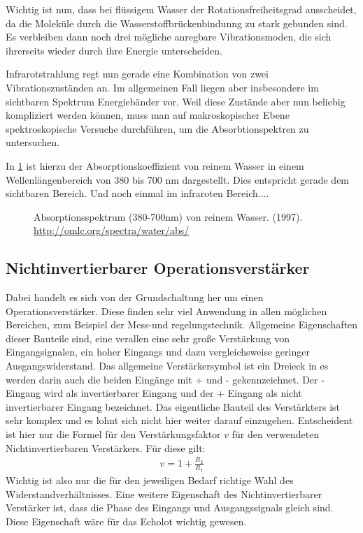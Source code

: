 \documentclass[12pt,a4paper,titlepage,headinclude,bibtotoc]{scrartcl}
\begin{document}
Wichtig ist nun, dass bei flüssigem Wasser der Rotationsfreiheitsgrad ausscheidet, da die Moleküle durch die Wasserstoffbrückenbindunng zu stark gebunden sind.
Es verbleiben dann noch drei mögliche anregbare Vibrationsmoden, die sich ihrerseits wieder durch ihre Energie unterscheiden.

Infrarotstrahlung regt nun gerade eine Kombination von zwei Vibrationszuständen an.
Im allgemeinen Fall liegen aber insbesondere im sichtbaren Spektrum Energiebänder vor.
Weil diese Zustände aber nun beliebig kompliziert werden können, muss man auf makroskopischer Ebene spektroskopische Versuche durchführen, um die Absorbtionspektren zu untersuchen.

In \ref{fig:abs} ist hierzu der Absorptionskoeffizient von reinem Wasser in einem Wellenlängenbereich von 380 bis 700 nm dargestellt.
Dies entspricht gerade dem sichtbaren Bereich.
Und noch einmal im infraroten Bereich....

\begin{figure}[h]
	\centering
	
	\caption{Absorptionsspektrum (380-700nm) von reinem Wasser. (1997). \url{http://omlc.org/spectra/water/abs/}}
	\label{fig:abs}
\end{figure}




\subsection{Nichtinvertierbarer Operationsverstärker}

Dabei handelt es sich von der Grundschaltung her um einen Operationsverstärker.
Diese finden sehr viel Anwendung in allen möglichen Bereichen, zum Beispiel 
der Mess-und regelungstechnik. 
Allgemeine Eigenschaften dieser Bauteile sind, eine verallen eine sehr große Verstärkung
von Eingangsignalen, ein hoher Eingangs und dazu vergleichsweise geringer Ausgangswiderstand.
Das allgemeine Verstärkersymbol ist ein Dreieck in es werden darin auch die beiden
Eingänge mit + und - gekennzeichnet.
Der - Eingang wird als invertierbarer Eingang und 
der + Eingang als nicht invertierbarer Eingang bezeichnet.
Das eigentliche Bauteil des Verstärkters ist sehr komplex und es lohnt sich nicht hier 
weiter darauf einzugehen.
Entscheident ist hier nur die Formel für den Verstärkungsfaktor $v$ für den verwendeten 
Nichtinvertierbaren Verstärkers. Für diese gilt:
\begin{align}
 v = 1 + \frac{R_2}{R_1}
\end{align}
Wichtig ist also nur die für den jeweiligen Bedarf richtige Wahl des Widerstandverhältnisses.
Eine weitere Eigenschaft des Nichtinvertierbarer Verstärker ist, dass die Phase des Eingangs
und Ausgangssignals gleich sind. Diese Eigenschaft wäre für das Echolot wichtig gewesen.
\end{document}
